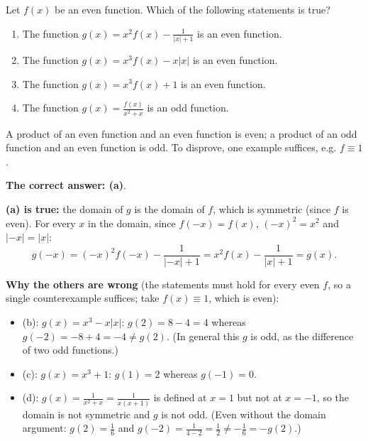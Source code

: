 
\begin{question}
Let $f(x)$ be an even function. Which of the following statements is true?
\begin{enumerate}
  \item The function $g(x)=x^2f(x)-\frac{1}{|x|+1}$ is an even function.
  \item The function $g(x)=x^3f(x)-x|x|$ is an even function.
  \item The function $g(x)=x^3f(x)+1$ is an even function.
  \item The function $g(x)=\frac{f(x)}{x^2+x}$ is an odd function.
\end{enumerate}
\end{question}

\begin{hint}
A product of an even function and an even function is even; a product of an odd function and an even function is odd. To disprove, one example suffices, e.g. $f\equiv1$.
\end{hint}

\begin{solution}
\textbf{The correct answer: (a)}.

\textbf{(a) is true:} the domain of $g$ is the domain of $f$, which is symmetric (since $f$ is even). For every $x$ in the domain, since $f(-x)=f(x)$, $(-x)^2=x^2$ and $|-x|=|x|$:
\[
g(-x)=(-x)^2f(-x)-\frac{1}{|-x|+1}=x^2f(x)-\frac{1}{|x|+1}=g(x).
\]

\textbf{Why the others are wrong} (the statements must hold for every even $f$, so a single counterexample suffices; take $f(x)\equiv1$, which is even):
\begin{itemize}
  \item (b): $g(x)=x^3-x|x|$: $g(2)=8-4=4$ whereas $g(-2)=-8+4=-4\neq g(2)$. (In general this $g$ is odd, as the difference of two odd functions.)
  \item (c): $g(x)=x^3+1$: $g(1)=2$ whereas $g(-1)=0$.
  \item (d): $g(x)=\frac{1}{x^2+x}=\frac{1}{x(x+1)}$ is defined at $x=1$ but not at $x=-1$, so the domain is not symmetric and $g$ is not odd. (Even without the domain argument: $g(2)=\frac16$ and $g(-2)=\frac{1}{4-2}=\frac12\neq-\frac16=-g(2)$.)
\end{itemize}
\end{solution}
